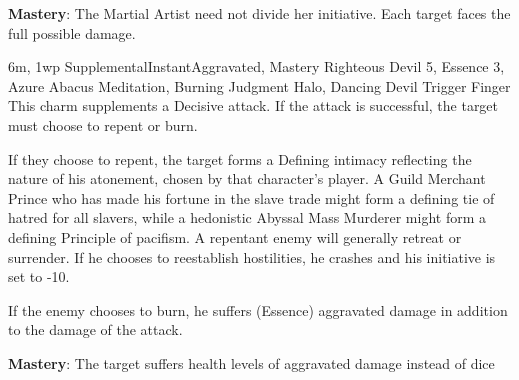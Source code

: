 \textbf{Mastery}: The Martial Artist need not divide her initiative.
Each target faces the full possible damage.

{6m, 1wp}
{Supplemental}{Instant}{Aggravated, Mastery}
{Righteous Devil 5, Essence 3, Azure Abacus Meditation, Burning Judgment Halo, Dancing Devil Trigger Finger}
This charm supplements a Decisive attack.
If the attack is successful, the target must choose to repent or burn.

If they choose to repent, the target forms a Defining intimacy reflecting the nature of his atonement,
chosen by that character's player.
A Guild Merchant Prince who has made his fortune in the slave trade might form a defining tie of hatred for all slavers,
while a hedonistic Abyssal Mass Murderer might form a defining Principle of pacifism.
A repentant enemy will generally retreat or surrender.
If he chooses to reestablish hostilities, he crashes and his initiative is set to -10.

If the enemy chooses to burn, he suffers (Essence) aggravated damage in addition to the damage of the attack.

\textbf{Mastery}: The target suffers health levels of aggravated damage instead of dice
